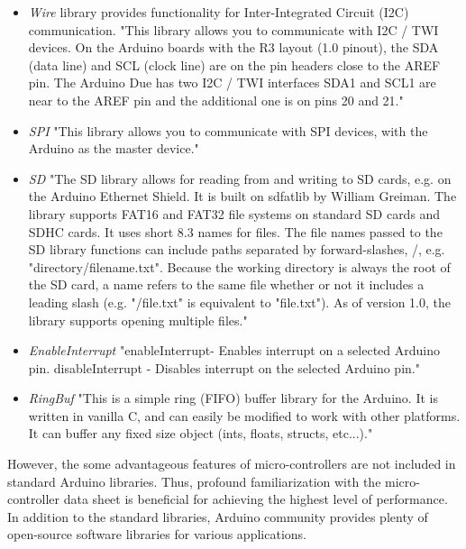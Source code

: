 \documentclass[english,12pt,a4paper,pdftex,elec,utf8]{aaltothesis}
\begin{document}
\begin{itemize}
\item \textit{Wire} library provides functionality for Inter-Integrated Circuit (I2C) communication. "This library allows you to communicate with I2C / TWI devices. On the Arduino boards with the R3 layout (1.0 pinout), the SDA (data line) and SCL (clock line) are on the pin headers close to the AREF pin. The Arduino Due has two I2C / TWI interfaces SDA1 and SCL1 are near to the AREF pin and the additional one is on pins 20 and 21." \cite{arduinowire}

\item \textit{SPI} "This library allows you to communicate with SPI devices, with the Arduino as the master device." \cite{arduinospi}

\item \textit{SD} "The SD library allows for reading from and writing to SD cards, e.g. on the Arduino Ethernet Shield. It is built on sdfatlib by William Greiman. The library supports FAT16 and FAT32 file systems on standard SD cards and SDHC cards. It uses short 8.3 names for files. The file names passed to the SD library functions can include paths separated by forward-slashes, /, e.g. "directory/filename.txt". Because the working directory is always the root of the SD card, a name refers to the same file whether or not it includes a leading slash (e.g. "/file.txt" is equivalent to "file.txt"). As of version 1.0, the library supports opening multiple files." \cite{arduinosd}

\item \textit{EnableInterrupt} "enableInterrupt- Enables interrupt on a selected Arduino pin. disableInterrupt - Disables interrupt on the selected Arduino pin." \cite{arduinoenableinterrupt}

\item \textit{RingBuf} "This is a simple ring (FIFO) buffer library for the Arduino. It is written in vanilla C, and can easily be modified to work with other platforms. It can buffer any fixed size object (ints, floats, structs, etc...)." \cite{arduinoringbuf}
\end{itemize}

However, the some advantageous features of micro-controllers are not included in standard Arduino libraries. Thus, profound familiarization with the micro-controller data sheet is beneficial for achieving the highest level of performance. In addition to the standard libraries, Arduino community provides plenty of open-source software libraries for various applications. 
\end{document}
